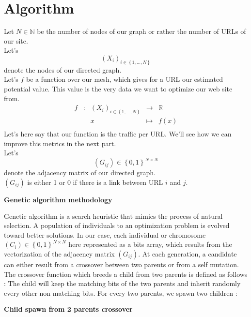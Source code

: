 \documentclass{iSWAGArticle}
\begin{document}
\section{Algorithm}
Let $N \in \mathbb{N}$ be the number of nodes of our graph or rather the number of URLs of our site.
 \\\newline
Let's $$\left(X_i\right)_{i \in \left\{1,...,N\right\}}$$ denote the nodes of our directed graph.
 \\\newline
Let's $f$ be a function over our mesh, which gives for a URL our estimated potential value. This value is the
very data we want to optimize our web site from.
\begin{equation}
\begin{array}{ccccc}
f & : & \left(X_i\right)_{i \in \left\{1,...,N\right\}} & \to & \mathbb{R} \\
 & & x & \mapsto & f(x) \\
\end{array}
\end{equation}
Let's here say that our function is the traffic per URL. We'll see how we can improve this metrics in the next part.
 \\\newline
Let's $$\left(G_{ij}\right)  \in \left\{0,1\right\}^{N\times N}$$ denote the adjacency matrix of our directed graph.
 \\\newline
$\left(G_{ij}\right)$ is either 1 or 0 if there is a link between URL $i$ and $j$.
\begin{center}
\textbf{\large Genetic algorithm methodology}
\end{center}
Genetic algorithm is a search heuristic that mimics the process of natural selection. 
A population of individuals to an optimization problem is evolved toward better solutions. 
In our case, each individual or chromosome $\left(C_{i}\right)  \in \left\{0,1\right\}^{N\times N}$ here represented as a bits array, which results from the vectorization of
the adjacency matrix $\left(G_{ij}\right)$.
At each generation, a candidate can either result from a crossover between two parents or from a self mutation.
The crossover function which breeds a child from two parents is defined as follows :
The child will keep the matching bits of the two parents and inherit randomly every other non-matching bits.
For every two parents, we spawn two children :
\begin{center}
\textbf{\large Child spawn from 2 parents crossover}
\end{center}
\end{document}
